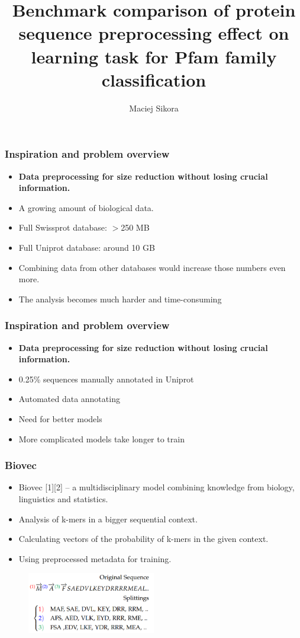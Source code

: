 \documentclass[10pt]{beamer}
\title{Benchmark comparison of protein sequence preprocessing effect on learning task for Pfam family classification}
\author{Maciej Sikora}
\begin{document}
\frame{\titlepage}


\begin{frame}
\frametitle{Inspiration and problem overview}
\begin{itemize}
\item \textbf{Data preprocessing for size reduction without losing crucial information.}
\end{itemize}

\begin{itemize}
\item A growing amount of biological data.
\item Full Swissprot database:  $>$250 MB
\item Full Uniprot database: around 10 GB
\item Combining data from other databases would increase those numbers even more.
\item The analysis becomes much harder and time-consuming
\end{itemize}
\end{frame}

\begin{frame}
\frametitle{Inspiration and problem overview}
\begin{itemize}
\item \textbf{Data preprocessing for size reduction without losing crucial information.}
\end{itemize}

\begin{itemize}
\item 0.25\% sequences manually annotated in Uniprot
\item Automated data annotating
\item Need for better models
\item More complicated models take longer to train
\end{itemize}
\end{frame}

\begin{frame}
\frametitle{Biovec}
\begin{itemize}
\item Biovec [1][2] -- a multidisciplinary model combining knowledge from biology, linguistics and statistics.
\item Analysis of k-mers in a bigger sequential context.
\item Calculating vectors of the probability of k-mers in the given context.
\item Using preprocessed metadata for training.
\end{itemize}
\begin{figure}[H]
\begin{center}
\includegraphics[width=0.5\textwidth]{biovec}
\end{center}
\end{figure}
\end{frame}
\end{document}
